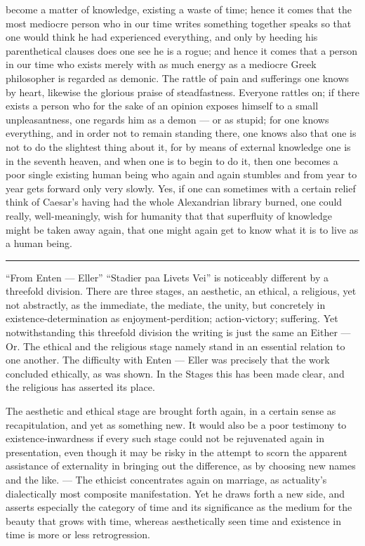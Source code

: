\documentclass[12pt,a4paper,openany]{book}
\newcommand{\opage}[1]{\marginnote{\footnotesize\textit{[#1]}}}
\newcommand{\sectionrule}{\par\begin{center}\rule{4em}{0.4pt}\end{center}}
\begin{document}
become a matter of knowledge, existing a waste of time; hence it comes that the most
mediocre person who in our time writes something together speaks so that one would
think he had experienced everything, and only by heeding his parenthetical clauses does
one see he is a rogue; and hence it comes that a person in our time who exists merely
with as much energy as a mediocre Greek philosopher is regarded as demonic. The rattle
of pain and sufferings one knows by heart, likewise the glorious praise of
steadfastness. Everyone rattles on; if there exists a person who for the sake of an
opinion exposes himself to a small unpleasantness, one regards him as a demon --- or as
stupid; for one knows everything, and in order not to remain standing there, one knows
also that one is not to do the slightest thing about it, for by
\setcounter{footnote}{0}%
\opage{193}means of external knowledge one is in the seventh heaven, and when one is to
begin to do it, then one becomes a poor single existing human being who again and again
stumbles and from year to year gets forward only very slowly. Yes, if one can sometimes
with a certain relief think of Caesar's having had the whole Alexandrian library
burned, one could really, well-meaningly, wish for humanity that that superfluity of
knowledge might be taken away again, that one might again get to know what it is to
live as a human being.

\sectionrule

``From Enten --- Eller'' ``Stadier paa Livets Vei'' is noticeably different by a
threefold division. There are three stages, an aesthetic, an ethical, a religious, yet
not abstractly, as the immediate, the mediate, the unity, but concretely in
existence-determination as enjoyment-perdition; action-victory; suffering. Yet
notwithstanding this threefold division the writing is just the same an Either --- Or.
The ethical and the religious stage namely stand in an essential relation to one
another. The difficulty with Enten --- Eller was precisely that the work concluded
ethically, as was shown. In the Stages this has been made clear, and the religious has
asserted its place.

The aesthetic and ethical stage are brought forth again, in a certain sense as
recapitulation, and yet as something new. It would also be a poor testimony to
existence-inwardness if every such stage could not be rejuvenated again in
presentation, even though it may be risky in the attempt to scorn the apparent
assistance of externality in bringing out the difference, as by choosing new names and
the like. --- The ethicist concentrates again on marriage, as actuality's dialectically
most composite manifestation. Yet he draws forth a new side, and asserts especially
the category of time and its significance as the medium for the beauty that grows with
time, whereas aesthetically seen
\setcounter{footnote}{0}%
\opage{194}time and existence in time is more or less retrogression.
\end{document}
